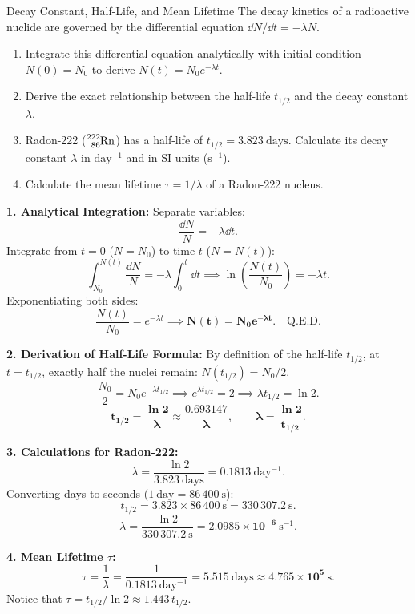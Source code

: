 \begin{exercise}{Decay Constant, Half-Life, and Mean Lifetime}
The decay kinetics of a radioactive nuclide are governed by the differential equation $\dd N / \dd t = -\lambda N$.
\begin{enumerate}[leftmargin=1.5em,itemsep=2pt]
  \item Integrate this differential equation analytically with initial condition $N(0) = N_0$ to derive $N(t) = N_0 e^{-\lambda t}$.
  \item Derive the exact relationship between the half-life $t_{1/2}$ and the decay constant $\lambda$.
  \item Radon-222 ($\ce{^{222}_{86}Rn}$) has a half-life of $t_{1/2} = 3.823\ \mathrm{days}$. Calculate its decay constant $\lambda$ in $\mathrm{day^{-1}}$ and in SI units ($\mathrm{s^{-1}}$).
  \item Calculate the mean lifetime $\tau = 1/\lambda$ of a Radon-222 nucleus.
\end{enumerate}
\end{exercise}

\begin{tabletworkspace}[5.0cm]
\end{tabletworkspace}

\begin{solution}
\textbf{1. Analytical Integration:}
Separate variables:
\[
\frac{\dd N}{N} = -\lambda \dd t.
\]
Integrate from $t = 0$ ($N = N_0$) to time $t$ ($N = N(t)$):
\[
\int_{N_0}^{N(t)} \frac{\dd N}{N} = -\lambda \int_0^t \dd t \implies \ln \left( \frac{N(t)}{N_0} \right) = -\lambda t.
\]
Exponentiating both sides:
\[
\frac{N(t)}{N_0} = e^{-\lambda t} \implies \mathbf{N(t) = N_0 e^{-\lambda t}}. \quad \text{Q.E.D.}
\]

\textbf{2. Derivation of Half-Life Formula:}
By definition of the half-life $t_{1/2}$, at $t = t_{1/2}$, exactly half the nuclei remain: $N(t_{1/2}) = N_0 / 2$.
\[
\frac{N_0}{2} = N_0 e^{-\lambda t_{1/2}} \implies e^{\lambda t_{1/2}} = 2 \implies \lambda t_{1/2} = \ln 2.
\]
\[
\mathbf{t_{1/2} = \frac{\ln 2}{\lambda} \approx \frac{0.693147}{\lambda}}, \qquad \mathbf{\lambda = \frac{\ln 2}{t_{1/2}}}.
\]

\textbf{3. Calculations for Radon-222:}
\[
\lambda = \frac{\ln 2}{3.823\ \mathrm{days}} = \mathbf{0.1813\ \mathrm{day^{-1}}}.
\]
Converting days to seconds ($1\ \mathrm{day} = 86\,400\ \mathrm{s}$):
\[
t_{1/2} = 3.823 \times 86\,400\ \mathrm{s} = 330\,307.2\ \mathrm{s}.
\]
\[
\lambda = \frac{\ln 2}{330\,307.2\ \mathrm{s}} = \mathbf{2.0985 \times 10^{-6}\ \mathrm{s^{-1}}}.
\]

\textbf{4. Mean Lifetime $\tau$:}
\[
\tau = \frac{1}{\lambda} = \frac{1}{0.1813\ \mathrm{day^{-1}}} = \mathbf{5.515\ \mathrm{days}} \approx \mathbf{4.765 \times 10^5\ \mathrm{s}}.
\]
Notice that $\tau = t_{1/2} / \ln 2 \approx 1.443 \, t_{1/2}$.
\end{solution}

